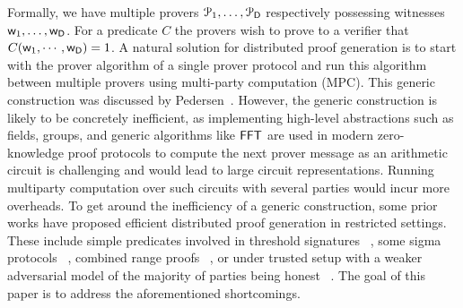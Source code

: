 Formally, we have multiple provers $\mathcal{P}_1, \ldots, \mathcal{P}_{\mathsf{D}}$
respectively possessing witnesses $\mathsf{w}_1, \ldots, \mathsf{w}_{\mathsf{D}}$. For a predicate $C$ the provers wish to prove to a verifier that $C(\mathsf{w}_1,\cdots,\mathsf{w}_{\mathsf{D}}) = 1$.  
A natural solution for distributed
proof generation is to start with the prover algorithm of a single prover
protocol and run this algorithm between multiple provers using multi-party computation (MPC). This generic construction was discussed by Pedersen~\cite{Ped92}. 
However, the generic construction is likely to be concretely
inefficient, as implementing high-level abstractions such as fields, groups, and generic algorithms like $\mathsf{FFT}$ are used in modern zero-knowledge proof protocols to compute the next prover message as an
arithmetic circuit is challenging and would lead to large circuit
representations. Running multiparty computation over such circuits with several
parties would incur more overheads.
To get around the inefficiency of a generic construction, some prior works have proposed efficient distributed proof generation in restricted settings. These include simple predicates involved in threshold signatures ~\cite{DDS}, some sigma protocols ~\cite{EfficientTZ}, combined range proofs ~\cite{bulletproofs},
or under trusted setup with a weaker adversarial model of the majority of parties
being honest ~\cite{trinocchio}. The goal of this paper is to address the
aforementioned shortcomings.

